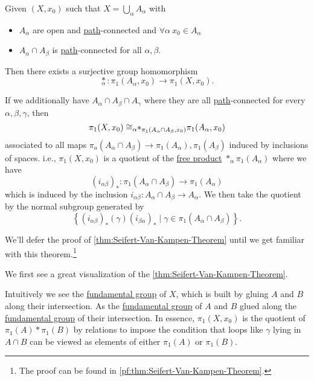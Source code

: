 \begin{theorem}\label{thm:Seifert-Van-Kampen-Theorem}
	Given \((X, x_0)\) such that \(X = \bigcup\limits_{\alpha } A_{\alpha }\) with
	\begin{itemize}
		\item \(A_{\alpha }\) are open and \hyperref[def:path]{path}-connected and \(\forall \alpha \ x_0\in A_{\alpha }\)
		\item \(A_{\alpha }\cap A_{\beta }\) is \hyperref[def:path]{path}-connected for all \(\alpha, \beta  \).
	\end{itemize}
	Then there exists a surjective group homomorphism
	\[
		\underset{\alpha }{\ast}\colon \pi _1(A_{\alpha }, x_0)\to \pi _1(X, x_0).
	\]

	\par If we additionally have \(A_{\alpha }\cap A_{\beta}\cap A_{\gamma}\) where they are all \hyperref[def:path]{path}-connected for every \(\alpha , \beta , \gamma\), then
	\[
		\pi _1(X, x_0)\cong _{\alpha }\hspace{-0.3em}\ast_{\pi _1(A_{\alpha }\cap A_{\beta }, x_0)}{}\pi _1(A_{\alpha }, x_0)
	\]
	associated to all maps \(\pi _a(A_{\alpha }\cap A_{\beta }) \to \pi _1 (A_{\alpha }), \pi _1(A_{\beta })\) induced by inclusions of spaces. i.e., \(\pi _1(X, x_0)\)
	is a quotient of the \hyperref[def:free-product-with-amalgamation]{free product} \(\ast_{\alpha}\pi _1(A_{\alpha })\) where we have
	\[
		(i_{\alpha \beta })_\ast\colon \pi _1(A_{\alpha }\cap A_{\beta })\to \pi _1(A_\alpha )
	\]
	which is induced by the inclusion \(i_{\alpha \beta }\colon A_{\alpha}\cap A_{\beta }\to A_{\alpha }\). We then take the quotient by the normal subgroup generated by
	\[
		\left\{(i_{\alpha \beta })_{\ast}(\gamma)(i_{\beta \alpha })_{\ast} \mid \gamma\in \pi _1(A_{\alpha }\cap A_{\beta })\right\}.
	\]
\end{theorem}
We'll defer the proof of \autoref{thm:Seifert-Van-Kampen-Theorem} until we get familiar with this theorem.\footnote{The proof can be found in \autoref{pf:thm:Seifert-Van-Kampen-Theorem}.}
\begin{eg}
	We first see a great visualization of the \autoref{thm:Seifert-Van-Kampen-Theorem}.
	\begin{figure}[H]
		\centering
		\label{fig:eg:Seifert-Van-Kampen-Theorem}
	\end{figure}
	Intuitively we see the \hyperref[def:fundamental-group]{fundamental group} of \(X\), which is built by gluing \(A\) and \(B\) along their intersection.
	As the \hyperref[def:fundamental-group]{fundamental group} of \(A\) and \(B\) glued along the \hyperref[def:fundamental-group]{fundamental group} of their
	intersection. In essence, \(\pi _1 (X, x_0)\) is the quotient of \(\pi _1(A)\ast \pi _1(B)\) by relations to impose the condition that loops like \(\gamma \)
	lying in \(A\cap B\) can be viewed as elements of either \(\pi _1(A)\) or \(\pi _1(B)\).
\end{eg}